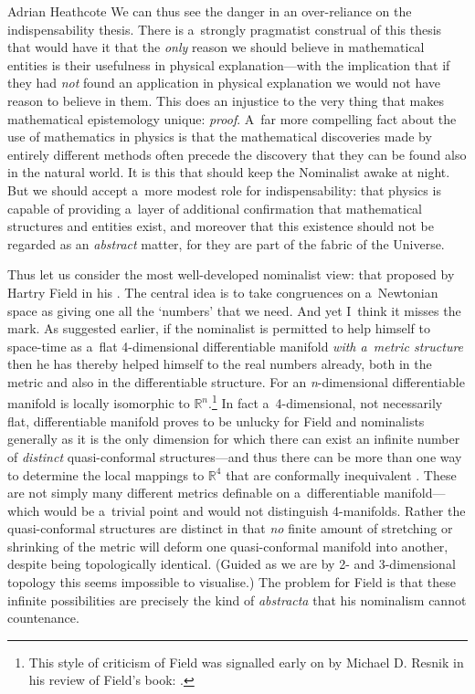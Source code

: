 \begin{artengenv}{Adrian Heathcote}
We can thus see the danger in an over-reliance on the indispensability thesis. There is a~strongly pragmatist construal of this thesis that would have it that the \textit{only} reason we should believe in mathematical entities is their usefulness in physical explanation---with the implication that if they had \textit{not} found an application in physical explanation we would not have reason to believe in them. This does an injustice to the very thing that makes mathematical epistemology unique: \textit{proof}. A~far more compelling fact about the use of mathematics in physics is that the mathematical discoveries made by entirely different methods often precede the discovery that they can be found also in the natural world. It is this that should keep the Nominalist awake at night. But we should accept a~more modest role for indispensability: that physics is capable of providing a~layer of additional confirmation that mathematical structures and entities exist, and moreover that this existence should not be regarded as an \textit{abstract} matter, for they are part of the fabric of the Universe.

Thus let us consider the most well-developed nominalist view: that proposed by Hartry Field in his \parencite*{field_science_1980}. The central idea is to take congruences on a~Newtonian space as giving one all the `numbers' that we need. And yet I~think it misses the mark. As suggested earlier, if the nominalist is permitted to help himself to space-time as a~flat 4-dimensional differentiable manifold \textit{with a~metric structure} then he has thereby helped himself to the real numbers already, both in the metric and also in the differentiable structure. For an \textit{n}-dimensional differentiable manifold is locally isomorphic to $\mathbb{R}^{n}$.\footnote{This style of criticism of Field was signalled early on by Michael D. Resnik in his review of Field's book: \parencites{resnik_hartry_1983}[also][]{resnik_how_1985}[see also][]{steiner_applicability_1998}.} In fact a~4-dimensional, not necessarily flat, differentiable manifold proves to be unlucky for Field and nominalists generally as it is the only dimension for which there can exist an infinite number of \textit{distinct} quasi-conformal structures---and thus there can be more than one way to determine the local mappings to $\mathbb{R}^{4}$ that are conformally inequivalent \parencite{donaldson_quasiconformal_1989}. These are not simply many different metrics definable on a~differentiable manifold---which would be a~trivial point and would not distinguish 4-manifolds. Rather the quasi-conformal structures are distinct in that \textit{no} finite amount of stretching or shrinking of the metric will deform one quasi-conformal manifold into another, despite being topologically identical. (Guided as we are by 2- and 3-dimensional topology this seems impossible to visualise.) The problem for Field is that these infinite possibilities are precisely the kind of \textit{abstracta} that his nominalism cannot countenance.


\end{artengenv}
